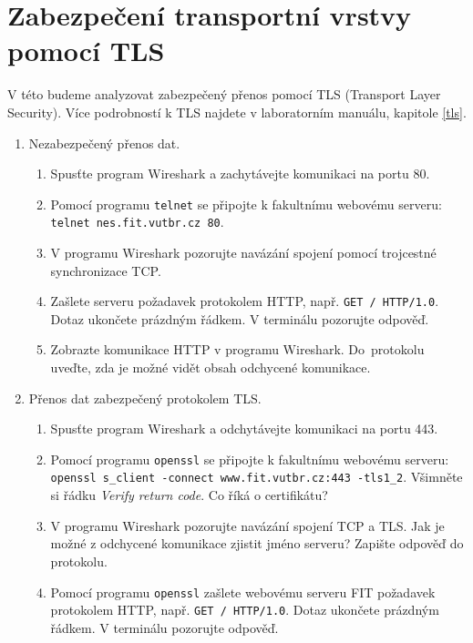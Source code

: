 \documentclass[a4paper,11pt]{article}
\begin{document}
\section{Zabezpečení transportní vrstvy pomocí TLS}
V této budeme analyzovat zabezpečený přenos pomocí TLS (Transport Layer Security). Více podrobností k TLS najdete v laboratorním manuálu, kapitole \ref{tls}. 
\begin{enumerate}
  \item Nezabezpečený přenos dat.
    \begin{enumerate}
      \item Spusťte program Wireshark a zachytávejte komunikaci na portu 80.
      \item Pomocí programu {\tt telnet} se připojte k fakultnímu webovému
        serveru: \\ \verb|telnet nes.fit.vutbr.cz 80|.
      \item V programu Wireshark pozorujte navázání spojení pomocí trojcestné synchronizace TCP.
      \item Zašlete serveru požadavek protokolem HTTP, např. \verb|GET / HTTP/1.0|. Dotaz ukončete prázdným řádkem. V terminálu pozorujte odpověď.
      \item Zobrazte komunikace HTTP v programu Wireshark.  Do~protokolu uveďte, zda je možné vidět obsah odchycené komunikace.
    \end{enumerate}

  \item Přenos dat zabezpečený protokolem TLS.
    \begin{enumerate}
      \item Spusťte program Wireshark a odchytávejte komunikaci na portu 443.
      \item Pomocí programu {\tt openssl} se připojte k fakultnímu webovému  serveru: \\ \verb|openssl s_client -connect www.fit.vutbr.cz:443 -tls1_2|. Všimněte si řádku \emph{Verify return code}. Co říká o certifikátu?

      \item V programu Wireshark pozorujte navázání spojení TCP a TLS. Jak je možné z odchycené komunikace zjistit jméno serveru? Zapište odpověď do protokolu.

      \item Pomocí programu \texttt{openssl} zašlete webovému serveru FIT požadavek protokolem HTTP, např. \verb|GET / HTTP/1.0|. Dotaz ukončete prázdným řádkem. V terminálu pozorujte odpověď.


\end{enumerate}
\end{enumerate}
\end{document}
